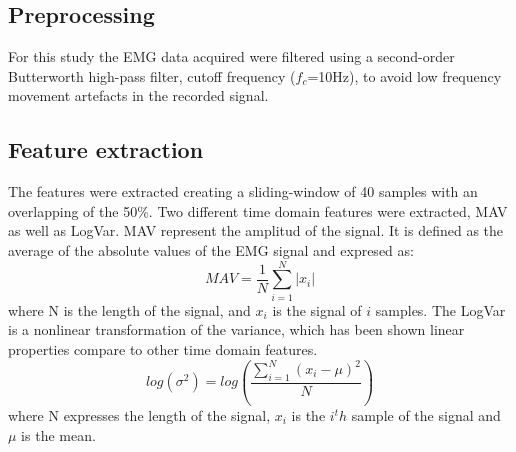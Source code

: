 	\subsection{Preprocessing}
	For this study the EMG data acquired were filtered using a second-order Butterworth high-pass filter, cutoff frequency ($f_c$=10Hz), to avoid low frequency movement artefacts in the recorded signal.\\
	
	\subsection{Feature extraction}
	The features were extracted creating a sliding-window of 40 samples with an overlapping of the 50\%. 
	Two different time domain features were extracted, MAV as well as LogVar. MAV represent the amplitud of the signal. It is defined as the average of the absolute values of the EMG signal and expresed as:
	\begin{equation}
	MAV = \frac{1}{N}\sum\limits_{i=1}^N|x_i|
	\end{equation}
	where N is the length of the signal, and $x_i$ is the signal of $i$ samples.
	The LogVar is a nonlinear transformation of the variance, which has been shown linear properties compare to other time domain features. \cite{hanhe2014}
	\begin{equation} \label{eq:logvar}
	log(\sigma^2) = log(\frac{\sum\limits_{i=1}^N(x_i - \mu)^2}{N})
	\end{equation}
	where N expresses the length of the signal, $x_i$ is the $i^th$ sample of the signal and $\mu$ is the mean.
